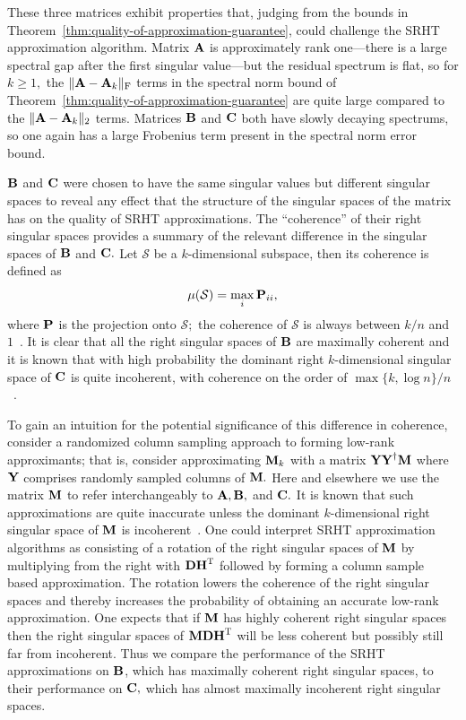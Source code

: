 These three matrices exhibit properties that, judging from the bounds in Theorem~\ref{thm:quality-of-approximation-guarantee}, could challenge the
SRHT approximation algorithm. Matrix ${\bm{\mathrm{A}}}$ is approximately rank
one---there is a large spectral gap after the first singular
value---but the residual spectrum is flat, so for $k \geq 1,$ the
$\mbox{}\|{\bm{\mathrm{A}}}- {\bm{\mathrm{A}}}_k\|_\mathrm{F}$ terms in the spectral norm bound of
Theorem~\ref{thm:quality-of-approximation-guarantee} are quite
large compared to the $\mbox{}\|{\bm{\mathrm{A}}}- {\bm{\mathrm{A}}}_k\|_2$ terms. Matrices ${\bm{\mathrm{B}}}$ and ${\bm{\mathrm{C}}}$ both have slowly decaying
spectrums, so one again has a large Frobenius term present in the
spectral norm error bound.

${\bm{\mathrm{B}}}$ and ${\bm{\mathrm{C}}}$ were chosen to have the same singular values but
different singular spaces to reveal any effect that the structure of the
singular spaces of the matrix has on the quality of SRHT approximations. The ``coherence'' of their right singular spaces provides a
summary of the relevant difference in the singular spaces of ${\bm{\mathrm{B}}}$ and ${\bm{\mathrm{C}}}.$ Let $\mathcal{S}$ be a
$k$-dimensional subspace, then its coherence is defined as
\[
 \mu(\mathcal{S}) = \max_{i} {\bm{\mathrm{P}}}_{ii},
\]
where ${\bm{\mathrm{P}}}$ is the projection onto $\mathcal{S};$ the coherence of $\mathcal{S}$ is always between $k/n$ and $1$~\cite{CR09}. It is clear that all the right singular spaces of ${\bm{\mathrm{B}}}$ are maximally coherent and it is known that with high probability the dominant right $k$-dimensional singular space of ${\bm{\mathrm{C}}}$ is quite incoherent, with coherence on the order of $ \max\{k, \log n\}/n$~\cite{CR09}.

To gain an intuition for the potential significance of this difference in coherence, consider a randomized column sampling approach to forming low-rank approximants; that is, consider approximating ${\bm{\mathrm{M}}}_k$ with a matrix ${\bm{\mathrm{Y}}} {\bm{\mathrm{Y}}}^\dagger {\ensuremath{\bm{\mathrm{M}}}}$ where ${\bm{\mathrm{Y}}}$ comprises randomly sampled columns of ${\bm{\mathrm{M}}}.$
Here and elsewhere we use the matrix ${\bm{\mathrm{M}}}$ to refer interchangeably to ${\bm{\mathrm{A}}}, {\bm{\mathrm{B}}},$ and ${\bm{\mathrm{C}}}.$
It is known that such approximations are quite inaccurate unless the dominant $k$-dimensional right singular space of ${\bm{\mathrm{M}}}$ is incoherent~\cite{RT10,Git12}. One could interpret SRHT approximation algorithms as consisting of a rotation of the right singular spaces of ${\bm{\mathrm{M}}}$ by multiplying from the right with ${\bm{\mathrm{D}}} {\bm{\mathrm{H}}}^{\textsc{T}}$ followed by forming a column sample based approximation. The rotation lowers the coherence of the right singular spaces and thereby increases the probability of obtaining an accurate low-rank approximation. One expects that if ${\bm{\mathrm{M}}}$ has highly coherent right singular spaces then the right singular spaces of ${\bm{\mathrm{M}}} {\bm{\mathrm{D}}} {\bm{\mathrm{H}}} ^{\textsc{T}}$ will be less coherent but possibly
still far from incoherent. Thus we compare the performance of the SRHT approximations on ${\bm{\mathrm{B}}}$, which has maximally coherent right singular spaces, to their performance on ${\bm{\mathrm{C}}},$ which has almost maximally incoherent right singular spaces.

